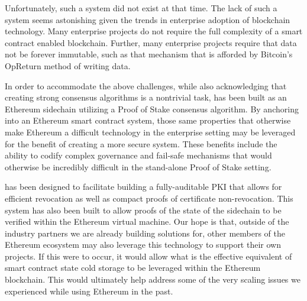 Unfortunately, such a system did not exist at that time.
The lack of such a system seems astonishing given the trends in
enterprise adoption of blockchain technology.
Many enterprise projects do not require the full complexity of a smart
contract enabled blockchain.
Further, many enterprise projects require that data not be forever
immutable, such as that mechanism that is afforded by Bitcoin's
OpReturn method of writing data.

In order to accommodate the above challenges, while also acknowledging
that creating strong consensus algorithms is a nontrivial task,
\LayerTwoLong{} has been built as an Ethereum sidechain utilizing a Proof of
Stake consensus algorithm.
By anchoring \LayerTwoLong{} into an Ethereum smart contract system, those
same properties that otherwise make Ethereum a difficult technology in
the enterprise setting may be leveraged for the benefit of creating a
more secure system.
These benefits include the ability to codify complex governance and
fail-safe mechanisms that would otherwise be incredibly difficult in
the stand-alone Proof of Stake setting.

\LayerTwoLong{} has been designed to facilitate building a fully-auditable
PKI that allows for efficient revocation as well as compact proofs of
certificate non-revocation.
This system has also been built to allow proofs of the state of the
sidechain to be verified within the Ethereum virtual machine.
Our hope is that, outside of the industry partners we are already
building solutions for, other members of the Ethereum ecosystem may
also leverage this technology to support their own projects.
If this were to occur, it would allow what is the effective equivalent
of smart contract state cold storage to be leveraged within the
Ethereum blockchain.
This would ultimately help address some of the very scaling issues we
experienced while using Ethereum in the past.
